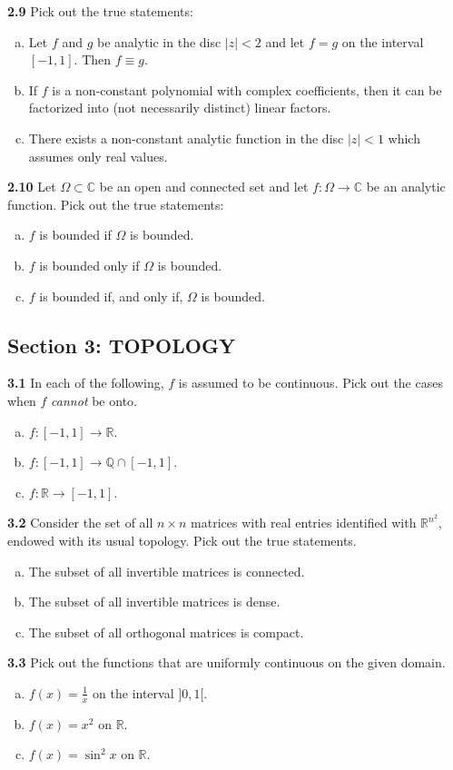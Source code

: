 \documentclass[11pt,a4paper]{article}
\newcommand{\Q}{\mathbb{Q}}
\newcommand{\R}{\mathbb{R}}
\newcommand{\C}{\mathbb{C}}
\newcommand{\examsec}[1]{%
  \subsection*{#1}
  \vspace{-2pt}
}
\newcommand{\qitem}[1]{\par\medskip\noindent\textbf{#1}\hspace{0.5em}}
\begin{document}
\qitem{2.9} Pick out the true statements:
\begin{enumerate}[a.]
  \item Let $f$ and $g$ be analytic in the disc $|z| < 2$ and let $f = g$ on the interval $[-1, 1]$. Then $f \equiv g$.
  \item If $f$ is a non-constant polynomial with complex coefficients, then it can be factorized into (not necessarily distinct) linear factors.
  \item There exists a non-constant analytic function in the disc $|z| < 1$ which assumes only real values.
\end{enumerate}

\qitem{2.10} Let $\Omega \subset \C$ be an open and connected set and let $f : \Omega \to \C$ be an analytic function. Pick out the true statements:
\begin{enumerate}[a.]
  \item $f$ is bounded if $\Omega$ is bounded.
  \item $f$ is bounded only if $\Omega$ is bounded.
  \item $f$ is bounded if, and only if, $\Omega$ is bounded.
\end{enumerate}

\examsec{Section 3: TOPOLOGY}

\qitem{3.1} In each of the following, $f$ is assumed to be continuous. Pick out the cases when $f$ \emph{cannot} be onto.
\begin{enumerate}[a.]
  \item $f : [-1, 1] \to \R$.
  \item $f : [-1, 1] \to \Q \cap [-1, 1]$.
  \item $f : \R \to [-1, 1]$.
\end{enumerate}

\qitem{3.2} Consider the set of all $n \times n$ matrices with real entries identified with $\R^{n^2}$, endowed with its usual topology. Pick out the true statements.
\begin{enumerate}[a.]
  \item The subset of all invertible matrices is connected.
  \item The subset of all invertible matrices is dense.
  \item The subset of all orthogonal matrices is compact.
\end{enumerate}

\qitem{3.3} Pick out the functions that are uniformly continuous on the given domain.
\begin{enumerate}[a.]
  \item $f(x) = \frac{1}{x}$ on the interval $]0, 1[$.
  \item $f(x) = x^2$ on $\R$.
  \item $f(x) = \sin^2 x$ on $\R$.
\end{enumerate}
\end{document}
